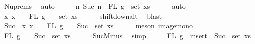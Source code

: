 \begin{isabellebody}
\ Nu{\isachardot}{\kern0pt}prems{\isacharparenleft}{\kern0pt}{}{\isacharparenright}{\kern0pt}\ \isamarkupfalse%
\ auto\isanewline
\ \ \isamarkupfalse%
\ \isamarkupfalse%
\ {\isachardoublequoteopen}{\isacharbraceleft}{\kern0pt}n{\isachardot}{\kern0pt}\ Suc\ n\ {\isasymin}\ FL\ g{\isacharbraceright}{\kern0pt}\ {\isasymsubseteq}\ set\ xs{\isachardoublequoteclose}\isanewline
\ \ \ \ \isamarkupfalse%
\ auto\isanewline
\ \ \isamarkupfalse%
\ \isamarkupfalse%
\ {\isachardoublequoteopen}{\isacharparenleft}{\kern0pt}{\isasymlambda}x{\isachardot}{\kern0pt}\ x\ {\isacharminus}{\kern0pt}\ {}{\isacharparenright}{\kern0pt}\ {\isacharbackquote}{\kern0pt}\ {\isacharparenleft}{\kern0pt}FL\ g\ {\isacharminus}{\kern0pt}\ {\isacharbraceleft}{\kern0pt}{}{\isacharbraceright}{\kern0pt}{\isacharparenright}{\kern0pt}\ {\isasymsubseteq}\ set\ xs{\isachardoublequoteclose}\isanewline
\ \ \ \ \isamarkupfalse%
\ shift{\isacharunderscore}{\kern0pt}down{\isacharunderscore}{\kern0pt}alt\ \isamarkupfalse%
\ blast\isanewline
\ \ \isamarkupfalse%
\ \isamarkupfalse%
\ {\isachardoublequoteopen}Suc\ {\isacharbackquote}{\kern0pt}\ {\isacharparenleft}{\kern0pt}{\isasymlambda}x{\isachardot}{\kern0pt}\ x\ {\isacharminus}{\kern0pt}\ {}{\isacharparenright}{\kern0pt}\ {\isacharbackquote}{\kern0pt}\ {\isacharparenleft}{\kern0pt}FL\ g\ {\isacharminus}{\kern0pt}\ {\isacharbraceleft}{\kern0pt}{}{\isacharbraceright}{\kern0pt}{\isacharparenright}{\kern0pt}\ {\isasymsubseteq}\ Suc\ {\isacharbackquote}{\kern0pt}\ set\ xs{\isachardoublequoteclose}\isanewline
\ \ \ \ \isamarkupfalse%
\ {\isacharparenleft}{\kern0pt}meson\ image{\isacharunderscore}{\kern0pt}mono{\isacharparenright}{\kern0pt}\isanewline
\ \ \isamarkupfalse%
\ \isamarkupfalse%
\ {\isachardoublequoteopen}{\isacharparenleft}{\kern0pt}FL\ g\ {\isacharminus}{\kern0pt}\ {\isacharbraceleft}{\kern0pt}{}{\isacharbraceright}{\kern0pt}{\isacharparenright}{\kern0pt}\ {\isasymsubseteq}\ Suc\ {\isacharbackquote}{\kern0pt}\ set\ xs{\isachardoublequoteclose}\isanewline
\ \ \ \ \isamarkupfalse%
\ SucMinus\ \isamarkupfalse%
\ simp\isanewline
\ \ \isamarkupfalse%
\ \isamarkupfalse%
\ {\isachardoublequoteopen}FL\ g\ {\isasymsubseteq}\ insert\ {}\ {\isacharparenleft}{\kern0pt}Suc\ {\isacharbackquote}{\kern0pt}\ set\ xs{\isacharparenright}{\kern0pt}{\isachardoublequoteclose}\isanewline

\end{isabellebody}
